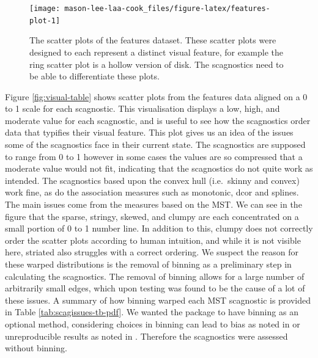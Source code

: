 \begin{figure}
\texttt{[image: mason-lee-laa-cook\_files/figure-latex/features-plot-1]} \caption{The scatter plots of the features dataset. These scatter plots were designed to each represent a distinct visual feature, for example the ring scatter plot is a hollow version of disk. The scagnostics need to be able to differentiate these plots.}\label{fig:features-plot}
\end{figure}

Figure \ref{fig:visual-table} shows scatter plots from the features data aligned on a 0 to 1 scale for each scagnostic. This visualisation displays a low, high, and moderate value for each scagnostic, and is useful to see how the scagnostics order data that typifies their visual feature. This plot gives us an idea of the issues some of the scagnostics face in their current state. The scagnostics are supposed to range from 0 to 1 however in some cases the values are so compressed that a moderate value would not fit, indicating that the scagnostics do not quite work as intended. The scagnostics based upon the convex hull (i.e.~skinny and convex) work fine, as do the association measures such as monotonic, dcor and splines. The main issues come from the measures based on the MST. We can see in the figure that the sparse, stringy, skewed, and clumpy are each concentrated on a small portion of 0 to 1 number line. In addition to this, clumpy does not correctly order the scatter plots according to human intuition, and while it is not visible here, striated also struggles with a correct ordering. We suspect the reason for these warped distributions is the removal of binning as a preliminary step in calculating the scagnostics. The removal of binning allows for a large number of arbitrarily small edges, which upon testing was found to be the cause of a lot of these issues. A summary of how binning warped each MST scagnostic is provided in Table \ref{tab:scagissues-tb-pdf}. We wanted the package to have binning as an optional method, considering choices in binning can lead to bias as noted in \citet{scagdist} or unreproducible results as noted in \citet{robust}. Therefore the scagnostics were assessed without binning.

